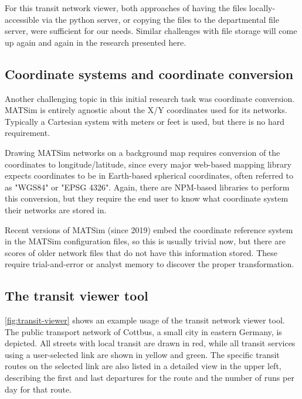 For this transit network viewer, both approaches of having the files locally-accessible via the python server, or copying the files to the departmental file server, were sufficient for our needs. Similar challenges with file storage will come up again and again in the research presented here.

\hypertarget{server-experiments-coords}{%
\subsection{Coordinate systems and coordinate conversion}
\label{server-experiments-coords}}

Another challenging topic in this initial research task was coordinate conversion. MATSim is entirely agnostic about the X/Y coordinates used for its networks. Typically a Cartesian system with meters or feet is used, but there is no hard requirement.

Drawing MATSim networks on a background map requires conversion of the coordinates to longitude/latitude, since every major web-based mapping library expects coordinates to be in Earth-based spherical coordinates, often referred to as "WGS84" or "EPSG 4326". Again, there are NPM-based libraries to perform this conversion, but they require the end user to know what coordinate system their networks are stored in.

Recent versions of MATSim (since 2019) embed the coordinate reference system in the MATSim configuration files, so this is usually trivial now, but there are scores of older network files that do not have this information stored. These require trial-and-error or analyst memory to discover the proper transformation.

\hypertarget{server-experiments-transit-result}{%
\subsection{The transit viewer tool}
\label{server-experiments-tool-transit}}

\autoref{fig:transit-viewer} shows an example usage of the transit network viewer tool. The public transport network of Cottbus, a small city in eastern Germany, is depicted. All streets with local transit are drawn in red, while all transit services using a user-selected link are shown in yellow and green. The specific transit routes on the selected link are also listed in a detailed view in the upper left, describing the first and last departures for the route and the number of runs per day for that route.

